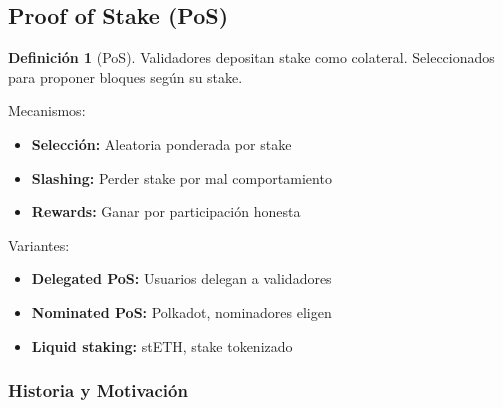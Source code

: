 \documentclass[11pt,a4paper,twoside,openright]{book}
\theoremstyle{definition}
\newtheorem{definition}{Definición}[chapter]
\theoremstyle{plain}
\theoremstyle{remark}
\begin{document}
\subsection{Proof of Stake (PoS)}

\begin{definition}[PoS]
Validadores depositan stake como colateral. Seleccionados para proponer bloques según su stake.
\end{definition}

Mecanismos:
\begin{itemize}
    \item \textbf{Selección:} Aleatoria ponderada por stake
    \item \textbf{Slashing:} Perder stake por mal comportamiento
    \item \textbf{Rewards:} Ganar por participación honesta
\end{itemize}

Variantes:
\begin{itemize}
    \item \textbf{Delegated PoS:} Usuarios delegan a validadores
    \item \textbf{Nominated PoS:} Polkadot, nominadores eligen
    \item \textbf{Liquid staking:} stETH, stake tokenizado
\end{itemize}

\subsubsection{Historia y Motivación}
\end{document}
